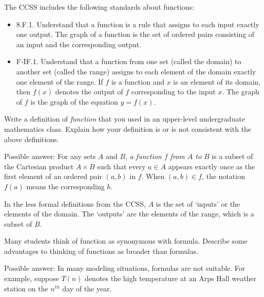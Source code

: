 \documentclass{ximera}
\begin{document}
The CCSS includes the following standards about functions: 
\begin{itemize}
\item 8.F.1. Understand that a function is a rule that assigns to each input exactly
one output. The graph of a function is the set of ordered pairs
consisting of an input and the corresponding output.

\item F-IF.1. Understand that a function from one set (called the domain) to
another set (called the range) assigns to each element of the domain
exactly one element of the range. If $f$ is a function and $x$ is an element
of its domain, then $f(x)$ denotes the output of $f$ corresponding to the
input $x$. The graph of $f$ is the graph of the equation $y = f(x)$.
\end{itemize}

\begin{question}
Write a definition of \emph{function} that you used in an upper-level undergraduate mathematics class.  Explain how your definition is or is not consistent with the above definitions.  
\begin{freeResponse}
\begin{hint}
Possible answer:  For any sets $A$ and $B$, \emph{a function $f$ from $A$ to $B$} is a subset of the Cartesian product $A\times B$ such that
every $a\in A$ appears exactly once as the first element of an ordered pair $(a,b)$ in $f$. When $(a,b)\in f$, the notation $f(a)$ means the corresponding $b$.  

In the less formal definitions from the CCSS, $A$ is the set of `inputs' or the elements of the domain.  The `outputs' are the elements of the range, which is a subset of $B$.   
\end{hint}
\end{freeResponse}
\end{question}


\begin{question}
Many students think of function as synonymous with formula.  Describe some advantages to thinking of functions as broader than formulas.
\begin{freeResponse}
\begin{hint}
Possible answer:  In many modeling situations, formulas are not suitable.  For example, suppose $T(n)$ denotes the high temperature 
at an Arps Hall weather station on the $n^{th}$ day of the year.  
\end{hint}
\end{freeResponse}
\end{question}
\end{document}
